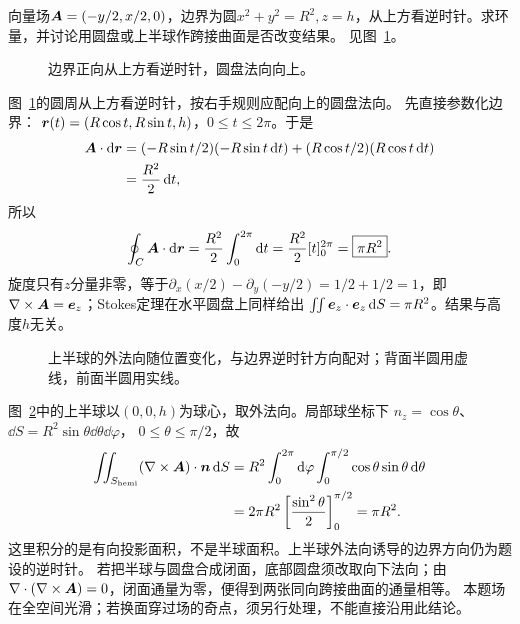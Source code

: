 \begin{exercise}[同边界曲面的Stokes积分]\label{ex:c4-h5}
向量场$\bm{A}=(-y/2,x/2,0)$，边界为圆$x^2+y^2=R^2,z=h$，从上方看逆时针。求环量，并讨论用圆盘或上半球作跨接曲面是否改变结果。 见图~\ref{fig:c4-h5-q}。
\end{exercise}

\begin{figure}[H]\centering
{}
\caption{边界正向从上方看逆时针，圆盘法向向上。}\label{fig:c4-h5-q}
\end{figure}
\begin{solution}
图~\ref{fig:c4-h5-q}的圆周从上方看逆时针，按右手规则应配向上的圆盘法向。
先直接参数化边界：
$\bm{r}(t)=(R\cos t,R\sin t,h)$，$0\le t\le2\pi$。于是
\[
 \begin{aligned}
 \bm{A}\cdot\mathop{}\!\mathrm d\bm{r}
 &=(-R\sin t/2)(-R\sin t\mathop{}\!\mathrm d t)
 +(R\cos t/2)(R\cos t\mathop{}\!\mathrm d t)\\
 &=\frac{R^2}{2}\mathop{}\!\mathrm d t,
 \end{aligned}
\]
所以
\[\oint_C\bm{A}\cdot\mathop{}\!\mathrm d\bm{r}=\frac{R^2}{2}\int_0^{2\pi}\mathop{}\!\mathrm d t
=\frac{R^2}{2}[t]_0^{2\pi}=\boxed{\pi R^2}.\]
旋度只有$z$分量非零，等于$\partial_x(x/2)-\partial_y(-y/2)=1/2+1/2=1$，即$\nabla\times\bm{A}=\bm{e}_z$；Stokes定理在水平圆盘上同样给出
$\iint \bm{e}_z\cdot\bm{e}_z\mathop{}\!\mathrm d S=\pi R^2$。结果与高度$h$无关。
\begin{figure}[H]\centering
{}
\caption{上半球的外法向随位置变化，与边界逆时针方向配对；背面半圆用虚线，前面半圆用实线。}\label{fig:c4-h5-s}
\end{figure}
图~\ref{fig:c4-h5-s}中的上半球以$(0,0,h)$为球心，取外法向。局部球坐标下
$n_z=\cos\theta$、$\dd S=R^2\sin\theta\dd\theta\dd\varphi$，
$0\le\theta\le\pi/2$，故
\[
 \begin{aligned}
 \iint_{S_{\rm hemi}}(\nabla\times\bm{A})\cdot\bm{n}\mathop{}\!\mathrm d S
 &=R^2\int_0^{2\pi}\mathop{}\!\mathrm d\varphi
 \int_0^{\pi/2}\cos\theta\sin\theta\mathop{}\!\mathrm d\theta\\
 &=2\pi R^2\left[\frac{\sin^2\theta}{2}\right]_0^{\pi/2}
 =\pi R^2.
 \end{aligned}
\]
这里积分的是有向投影面积，不是半球面积。上半球外法向诱导的边界方向仍为题设的逆时针。
若把半球与圆盘合成闭面，底部圆盘须改取向下法向；由
$\nabla\cdot(\nabla\times\bm{A})=0$，闭面通量为零，便得到两张同向跨接曲面的通量相等。
本题场在全空间光滑；若换面穿过场的奇点，须另行处理，不能直接沿用此结论。
\end{solution}

